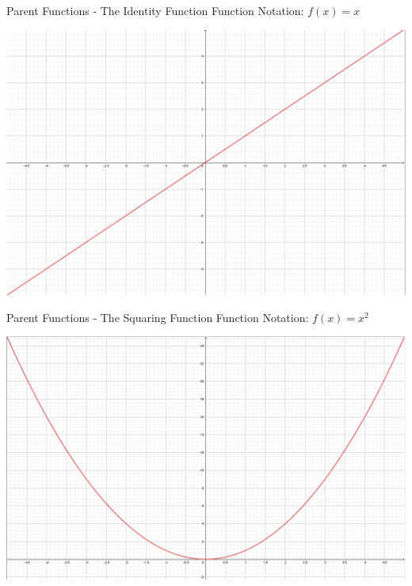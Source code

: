 \documentclass{beamer}
\begin{document}
\begin{frame}[t]{Parent Functions - The Identity Function}
Function Notation: $f(x) = x$

\includegraphics[width=\textwidth]{Identity.png}
\end{frame}

\begin{frame}[t]{Parent Functions - The Squaring Function}
Function Notation: $f(x) = x^2$

\includegraphics[width=\textwidth]{Squaring.png}
\end{frame}
\end{document}
